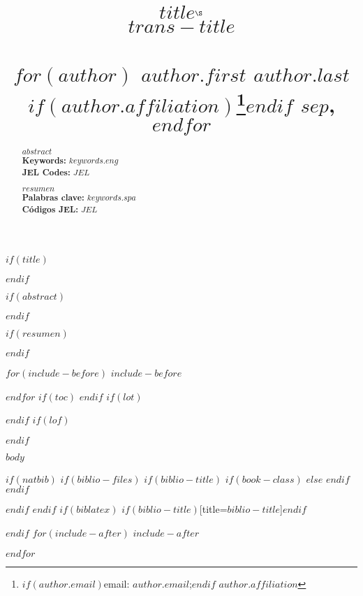 \documentclass[fontsize=10pt,lang=eng]{article}
\title{
\selectfont
\vspace{-1cm}
\noindent
{\sffamily 
{\bfseries
{\Large
$title$\(^\S\)} \\
\selectlanguage{spanish}
{\normalsize
$trans-title$}
}} \\
\selectlanguage{english}
\hfill \\
{\sffamily
{\normalsize
  $for(author)$
  $author.first$ $author.last$$if(author.affiliation)$\footnote{$if(author.email)$email: $author.email$;$endif$ $author.affiliation$}$endif$
  $sep$, $endfor$}}
\vspace{-2cm}}
\date{}
\begin{document}
\singlespacing

$if(title)$
\maketitle
$endif$

$if(abstract)$
\begin{abstract}
$abstract$\\
\textbf{Keywords:} $keywords.eng$ \\
\textbf{JEL Codes:} $JEL$
\end{abstract}
$endif$

$if(resumen)$
\begin{abstract}
$resumen$\\
\textbf{Palabras clave:} $keywords.spa$ \\
\textbf{Códigos JEL:} $JEL$
\end{abstract}
$endif$

$for(include-before)$
$include-before$

$endfor$
$if(toc)$
{
\hypersetup{linkcolor=black}
\setcounter{tocdepth}{$toc-depth$}
\tableofcontents
}
$endif$
$if(lot)$
\listoftables
$endif$
$if(lof)$
\listoffigures
$endif$


$body$


$if(natbib)$
$if(biblio-files)$
$if(biblio-title)$
$if(book-class)$
\renewcommand\bibname{$biblio-title$}
$else$
\renewcommand\refname{$biblio-title$}
$endif$
$endif$


$endif$
$endif$
$if(biblatex)$
\printbibliography$if(biblio-title)$[title=$biblio-title$]$endif$

$endif$
$for(include-after)$
$include-after$

$endfor$
\end{document}
